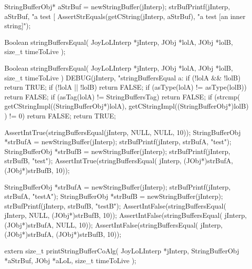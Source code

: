 \startCTest
  StringBufferObj* aStrBuf = newStringBuffer(jInterp);
  strBufPrintf(jInterp, aStrBuf, "a test [%
  AssertStrEquals(getCString(jInterp, aStrBuf), "a test [an inner string]");
\stopCTest
\stopTestCase
\stopTestSuite


\startCHeader
Boolean stringBuffersEqual(
  JoyLoLInterp *jInterp,
  JObj         *lolA,
  JObj         *lolB,
  size_t        timeToLive
);
\stopCHeader

\startCCode
Boolean stringBuffersEqual(
  JoyLoLInterp *jInterp,
  JObj         *lolA,
  JObj         *lolB,
  size_t        timeToLive
) {
  DEBUG(jInterp, "stringBuffersEqual a:%
  if (!lolA && !lolB) return TRUE;
  if (!lolA || !lolB) return FALSE;
  if (asType(lolA) != asType(lolB)) return FALSE;
  if (asTag(lolA)  != StringBuffersTag) return FALSE;
  if (strcmp(
    getCStringImpl((StringBufferObj*)lolA),
    getCStringImpl((StringBufferObj*)lolB)
    ) != 0) return FALSE;
  return TRUE;
}
\stopCCode


\startCTest
  AssertIntTrue(stringBuffersEqual(jInterp, NULL, NULL, 10));
  StringBufferObj *strBufA = newStringBuffer(jInterp);
  strBufPrintf(jInterp, strBufA, "test");
  StringBufferObj *strBufB = newStringBuffer(jInterp);
  strBufPrintf(jInterp, strBufB, "test");
  AssertIntTrue(stringBuffersEqual(
    jInterp, (JObj*)strBufA, (JObj*)strBufB, 10));
\stopCTest
\stopTestCase


\startCTest
  StringBufferObj *strBufA = newStringBuffer(jInterp);
  strBufPrintf(jInterp, strBufA, "testA");
  StringBufferObj *strBufB = newStringBuffer(jInterp);
  strBufPrintf(jInterp, strBufB, "testB");
  AssertIntFalse(stringBuffersEqual(
    jInterp, NULL, (JObj*)strBufB, 10));
  AssertIntFalse(stringBuffersEqual(
    jInterp, (JObj*)strBufA, NULL, 10));
  AssertIntFalse(stringBuffersEqual(
    jInterp, (JObj*)strBufA, (JObj*)strBufB, 10));
\stopCTest
\stopTestCase
\stopTestSuite


\startCHeader
extern size_t printStringBufferCoAlg(
  JoyLoLInterp    *jInterp,
  StringBufferObj *aStrBuf,
  JObj            *aLoL,
  size_t           timeToLive
);
\stopCHeader
{}

